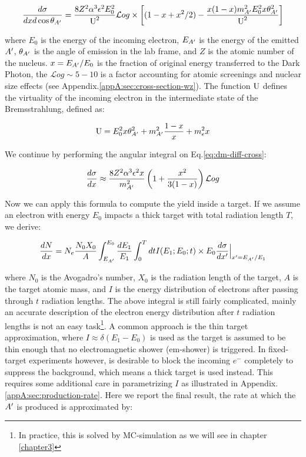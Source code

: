 \begin{equation}
  \label{eq:dm-diff-cross}
  \frac{d\sigma}{dxd\cos{\theta_{A'}}} = \frac{8 Z^2 \alpha^3 \epsilon^2 E^2_0}{\textrm{U}^2} \mathcal{L}og \times \left[ (1 - x + x^2/2) - \frac{x(1-x)m^2_{A'}E^2_0 x \theta^2_{A'}}{\textrm{U}^2} \right]
\end{equation}

where $E_0$ is the energy of the incoming electron, $E_{A'}$ is the energy of the emitted $A'$, $\theta_{A'}$ is the angle of emission in the lab frame, and $Z$ is the atomic number of the nucleus. $x=E_{A'}/E_0$ is the fraction of original energy transferred to the Dark Photon, the $\mathcal{L}og \sim 5 - 10$ is a factor accounting for atomic screenings and nuclear size effects (see Appendix.\ref{appA:sec:cross-section-wz}). The function $\rm{U}$ defines the virtuality of the incoming electron in the intermediate state of the Bremsstrahlung, defined as:

\begin{equation}
  \label{eq:u-func}
  \textrm{U} = E^2_0 x \theta^2_{A'} + m^2_{A'} \frac{1 - x}{x} + m^2_e x
\end{equation}

We continue by performing the angular integral on Eq.\ref{eq:dm-diff-cross}:

\begin{equation}
  \label{eq:dm-diff-cross-int}
  \frac{d\sigma}{dx} \approx \frac{8 Z^2 \alpha^3 \epsilon^2 x}{m^2_{A'}} \left( 1 + \frac{x^2}{3(1-x)} \right) \mathcal{L}og 
\end{equation}

Now we can apply this formula to compute the yield inside a target. If we assume an electron with energy $E_0$ impacts a thick target with total radiation length $T$, we derive:

\begin{equation}
  \label{eq:dm-general-yield}
  \frac{dN}{dx} = N_e \frac{N_0 X_0}{A} \int_{E_{A'}}^{E_0} \frac{dE_1}{E_1} \int_0^T dt I(E_1;E_0;t) \times E_0 \frac{d\sigma}{dx'}\Big|_{x' = E_{A'}/E_1}
\end{equation}

where $N_0$ is the Avogadro's number, $X_0$ is the radiation length of the target, $A$ is the target atomic mass, and $I$ is the energy distribution of electrons after passing through $t$ radiation lengths. The above integral is still fairly complicated, mainly an accurate description of the electron energy distribution after $t$ radiation lengths is not an easy task\footnote{In practice, this is solved by MC-simulation as we will see in chapter \ref{chapter3}}. A common approach is the thin target approximation, where $I \approx \delta (E_1 - E_0)$ is used as the target is assumed to be thin enough that no electromagnetic shower (em-shower) is triggered. In fixed-target experiments however, is desirable to block the incoming $e^-$ completely to suppress the background, which means a thick target is used instead. This requires some additional care in parametrizing $I$ as illustrated in Appendix.\ref{appA:sec:production-rate}. Here we report the final result, the rate at which the $A'$ is produced is approximated by:

